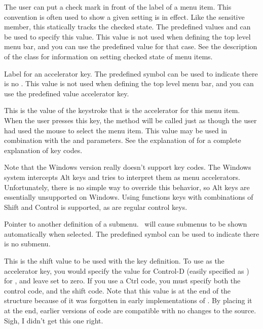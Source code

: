  The user can put a check mark in front of the
label of a menu item. This convention is often used to show a
given setting is in effect. Like the sensitive member, this
statically tracks the checked state. The predefined values
 and  can be used to specify this value.
This value is not used when defining the top level menu bar, and
you can use the predefined value  for that case.
See the description of the  class for information
on setting checked state of menu items.

 Label for an accelerator key. The
predefined symbol  can be used to indicate there
is no . This value is not used when defining the
top level menu bar, and you can use the predefined value 
accelerator key.

 This is the value of the keystroke that
is the accelerator for this menu item. When the user presses
this key, the  method will be
called just as though the user had used the mouse to select
the menu item. This value may be used in combination with the
 and  parameters. See the
explanation of  for a complete
explanation of key codes.

Note that the Windows version really doesn't support
 key codes. The Windows system intercepts
Alt keys and tries to interpret them as menu accelerators.
Unfortunately, there is no simple way to override this
behavior, so Alt keys are essentially unsupported on Windows.
Using functions keys with combinations of Shift and Control
is supported, as are regular control keys.

 Pointer to another 
definition of a submenu. \V\ will cause submenus to be shown
automatically when selected. The predefined symbol 
can be used to indicate there is no submenu.

 This is the shift value to
be used with the  key definition. To use
 as the accelerator key, you would specify the
value for Control-D (easily specified as ) for
, and leave  set to zero. If you use a
Ctrl code, you must specify both the control code, and the
 shift code. Note that this value is at the end
of the  structure because of it was forgotten in
early implementations of \V. By placing it at the end, earlier
versions of \V code are compatible with no changes to the source.
Sigh, I didn't get this one right.

